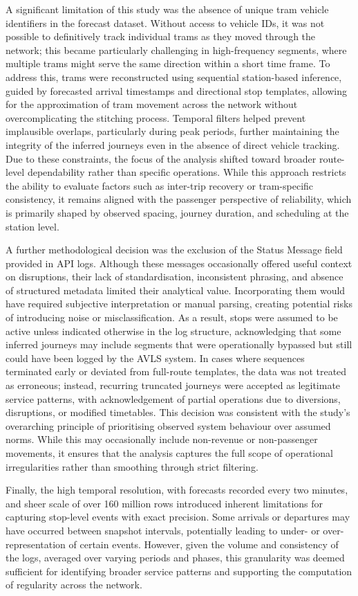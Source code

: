     A significant limitation of this study was the absence of unique tram vehicle identifiers in the forecast dataset. Without access to vehicle IDs, it was not possible to definitively track individual trams as they moved through the network; this became particularly challenging in high-frequency segments, where multiple trams might serve the same direction within a short time frame. To address this, trams were reconstructed using sequential station-based inference, guided by forecasted arrival timestamps and directional stop templates, allowing for the approximation of tram movement across the network without overcomplicating the stitching process. Temporal filters helped prevent implausible overlaps, particularly during peak periods, further maintaining the integrity of the inferred journeys even in the absence of direct vehicle tracking. Due to these constraints, the focus of the analysis shifted toward broader route-level dependability rather than specific operations. While this approach restricts the ability to evaluate factors such as inter-trip recovery or tram-specific consistency, it remains aligned with the passenger perspective of reliability, which is primarily shaped by observed spacing, journey duration, and scheduling at the station level.

    A further methodological decision was the exclusion of the Status Message field provided in API logs. Although these messages occasionally offered useful context on disruptions, their lack of standardisation, inconsistent phrasing, and absence of structured metadata limited their analytical value. Incorporating them would have required subjective interpretation or manual parsing, creating potential risks of introducing noise or misclassification. As a result, stops were assumed to be active unless indicated otherwise in the log structure, acknowledging that some inferred journeys may include segments that were operationally bypassed but still could have been logged by the AVLS system. In cases where sequences terminated early or deviated from full-route templates, the data was not treated as erroneous; instead, recurring truncated journeys were accepted as legitimate service patterns, with acknowledgement of partial operations due to diversions, disruptions, or modified timetables. This decision was consistent with the study’s overarching principle of prioritising observed system behaviour over assumed norms. While this may occasionally include non-revenue or non-passenger movements, it ensures that the analysis captures the full scope of operational irregularities rather than smoothing through strict filtering.

    Finally, the high temporal resolution, with forecasts recorded every two minutes, and sheer scale of over 160 million rows introduced inherent limitations for capturing stop-level events with exact precision. Some arrivals or departures may have occurred between snapshot intervals, potentially leading to under- or over-representation of certain events. However, given the volume and consistency of the logs, averaged over varying periods and phases, this granularity was deemed sufficient for identifying broader service patterns and supporting the computation of regularity across the network.
